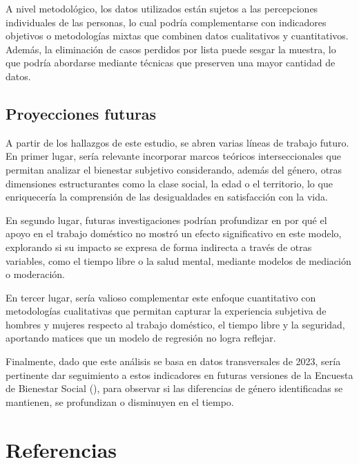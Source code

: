 \documentclass[
  spanish,
  a4paper,
  oneside]{scrbook}
\begin{document}
A nivel metodológico, los datos utilizados están sujetos a las
percepciones individuales de las personas, lo cual podría complementarse
con indicadores objetivos o metodologías mixtas que combinen datos
cualitativos y cuantitativos. Además, la eliminación de casos perdidos
por lista puede sesgar la muestra, lo que podría abordarse mediante
técnicas que preserven una mayor cantidad de datos.

\section{Proyecciones futuras}\label{proyecciones-futuras}

A partir de los hallazgos de este estudio, se abren varias líneas de
trabajo futuro. En primer lugar, sería relevante incorporar marcos
teóricos interseccionales que permitan analizar el bienestar subjetivo
considerando, además del género, otras dimensiones estructurantes como
la clase social, la edad o el territorio, lo que enriquecería la
comprensión de las desigualdades en satisfacción con la vida.

En segundo lugar, futuras investigaciones podrían profundizar en por qué
el apoyo en el trabajo doméstico no mostró un efecto significativo en
este modelo, explorando si su impacto se expresa de forma indirecta a
través de otras variables, como el tiempo libre o la salud mental,
mediante modelos de mediación o moderación.

En tercer lugar, sería valioso complementar este enfoque cuantitativo
con metodologías cualitativas que permitan capturar la experiencia
subjetiva de hombres y mujeres respecto al trabajo doméstico, el tiempo
libre y la seguridad, aportando matices que un modelo de regresión no
logra reflejar.

Finalmente, dado que este análisis se basa en datos transversales de
2023, sería pertinente dar seguimiento a estos indicadores en futuras
versiones de la Encuesta de Bienestar Social
(), para observar si las diferencias de género
identificadas se mantienen, se profundizan o disminuyen en el tiempo.


\chapter{Referencias}\label{referencias}
\end{document}
